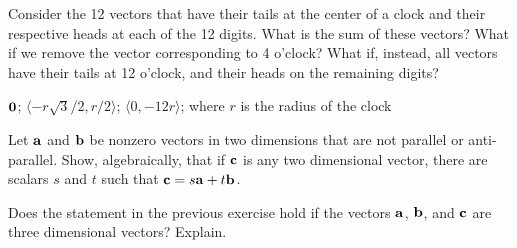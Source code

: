 \begin{enumialphparenastyle}
\begin{ex}
Consider the 12 vectors that have their tails at the center of a
clock and their respective heads at each of the 12 digits.  What is
the sum of these vectors?  What if we remove the vector corresponding
to 4 o'clock?  What if, instead, all vectors have their
tails at 12 o'clock, and their heads on the remaining digits?
\begin{sol}
$\bf 0$; $\langle -r\sqrt3/2,r/2\rangle$; $\langle
0,-12r\rangle$; where $r$ is the radius of the clock
\end{sol}
\end{ex}

\begin{ex}
Let $\bf a$ and $\bf b$ be nonzero vectors in two dimensions
that are not parallel or anti-parallel.  Show, algebraically, that if
$\bf c$ is any two dimensional vector, there are scalars $s$ and $t$
such that ${\bf c}=s{\bf a}+t{\bf b}$.
\end{ex}

\begin{ex}
Does the statement in the previous exercise hold if the vectors
$\bf a$, $\bf b$, and $\bf c$ are three dimensional vectors? Explain.
\end{ex}

\end{enumialphparenastyle}